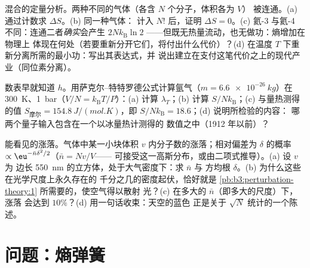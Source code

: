 \begin{exercise}[$\star\star\star$]\label{exo:b3:microcanonical-ensemble:10}
混合的定量分析。两种不同的气体（各含 $N$ 个分子，体积各为 $V$）
被连通。(a) 通过计数求 $\Delta S$。(b) 同一种气体：
计入 $N!$ 后，证明 $\Delta S = 0$。(c) 氦-3 与氦-4
不同：连通二者\emph{确实}会产生 $2Nk_{\text{B}}\ln2$
——但既无热量流动，也无做功：熵增加在物理上
体现在何处（若要重新分开它们，将付出什么代价）？(d)
在温度 $T$ 下重新分离所需的最小功：写出其表达式，并
说出建立在支付这笔代价之上的现代产业（同位素分离）。
\end{exercise}

\begin{exercise}[$\star\star\star$]\label{exo:b3:microcanonical-ensemble:11}
数表早就知道 $h$。用萨克尔–特特罗德公式计算氩气（$m =
\qty{6.6e-26}{kg}$）在 \qty{300}{K}、\qty{1}{bar}（$V/N =
k_{\text{B}}T/P$）：(a) 计算 $\lambda_T$；(b) 计算 $S/N
k_{\text{B}}$；(c) 与量热测得的值
$S_{\text{摩尔}} = \qty{154.8}{J/(mol.K)}$，即 $S/Nk_{\text{B}}
= 18.6$；(d) 说明所检验的内容：
哪两个量子输入包含在一个以冰量热计测得的
数值之中（1912 年以前）？
\end{exercise}

\begin{exercise}[$\star\star\star$]\label{exo:b3:microcanonical-ensemble:12}
能看见的涨落。气体中某一小块体积
$v$ 内分子数的涨落；相对偏差为 $\delta$ 的概率
$\propto\eu^{-\bar n\delta^2/2}$（$\bar n = Nv/V$——
可接受这一高斯分布，或由二项式推导）。(a) 设 $v$ 为
边长 \qty{550}{nm} 的立方体，处于大气密度下：求 $\bar n$ 与
方均根 $\delta$。(b) 为什么这些在光学尺度上永久存在的
千分之几的密度起伏，恰好就是
\cref{pb:b3:perturbation-theory:1} 所需要的，使空气得以散射
光？(c) 在多大的 $\bar n$（即多大的尺度）下，涨落
会达到 $10\%$？(d) 用一句话收束：天空的蓝色
正是关于 $\sqrt N$ 统计的一个陈述。
\end{exercise}

\section{问题：熵弹簧}

